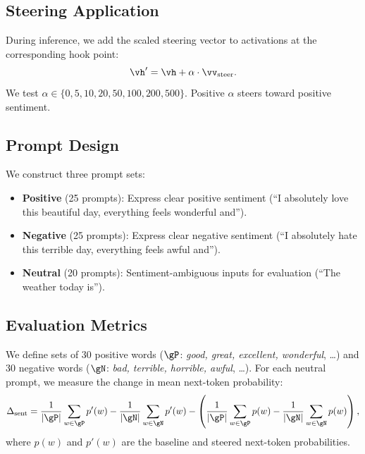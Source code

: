 \subsection{Steering Application}

During inference, we add the scaled steering vector to activations at the corresponding hook point:
\begin{equation}
    \vh' = \vh + \alpha \cdot \sv.
    \label{eq:steer}
\end{equation}
We test $\alpha \in \{0, 5, 10, 20, 50, 100, 200, 500\}$. Positive $\alpha$ steers toward positive sentiment.

\subsection{Prompt Design}
\label{sec:prompts}

We construct three prompt sets:
\begin{itemize}[leftmargin=*,itemsep=0pt,topsep=0pt]
    \item \textbf{Positive} (25 prompts): Express clear positive sentiment (\eg ``I absolutely love this beautiful day, everything feels wonderful and'').
    \item \textbf{Negative} (25 prompts): Express clear negative sentiment (\eg ``I absolutely hate this terrible day, everything feels awful and'').
    \item \textbf{Neutral} (20 prompts): Sentiment-ambiguous inputs for evaluation (\eg ``The weather today is'').
\end{itemize}

\subsection{Evaluation Metrics}
\label{sec:metrics}

We define sets of 30 positive words ($\gP$: \emph{good, great, excellent, wonderful}, \ldots) and 30 negative words ($\gN$: \emph{bad, terrible, horrible, awful}, \ldots). For each neutral prompt, we measure the change in mean next-token probability:
\begin{equation}
    \Delta_{\text{sent}} = \frac{1}{|\gP|}\sum_{w \in \gP} p'(w) - \frac{1}{|\gN|}\sum_{w \in \gN} p'(w) - \left(\frac{1}{|\gP|}\sum_{w \in \gP} p(w) - \frac{1}{|\gN|}\sum_{w \in \gN} p(w)\right),
    \label{eq:shift}
\end{equation}
where $p(w)$ and $p'(w)$ are the baseline and steered next-token probabilities.

